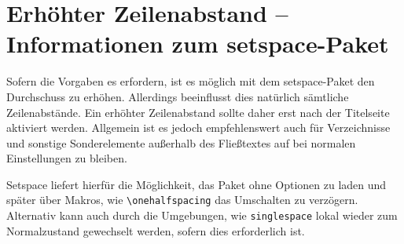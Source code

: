\documentclass[
	ngerman,
	ruledheaders=chapter,%
	class=book,%
	thesis={
		type=dr,
		dr=rernat
	},
	accentcolor=9c,%
	custommargins=true,%
	marginpar=false,%
	fontsize=11pt,%
]{tudapub}
\let\code\texttt
\let\tbs\textbackslash
\begin{document}
\section{Erhöhter Zeilenabstand -- Informationen zum setspace-Paket}
Sofern die Vorgaben es erfordern, ist es möglich mit dem setspace-Paket den Durchschuss zu erhöhen. Allerdings beeinflusst dies natürlich sämtliche Zeilenabstände. Ein erhöhter Zeilenabstand sollte daher erst nach der Titelseite aktiviert werden. Allgemein ist es jedoch empfehlenswert auch für Verzeichnisse und sonstige Sonderelemente außerhalb des Fließtextes auf bei normalen Einstellungen zu bleiben.

Setspace liefert hierfür die Möglichkeit, das Paket ohne Optionen zu laden und später über Makros, wie \code{\tbs{}onehalfspacing} das Umschalten zu verzögern. Alternativ kann auch durch die Umgebungen, wie \code{singlespace} lokal wieder zum Normalzustand gewechselt werden, sofern dies erforderlich ist.

\printbibliography
\end{document}
